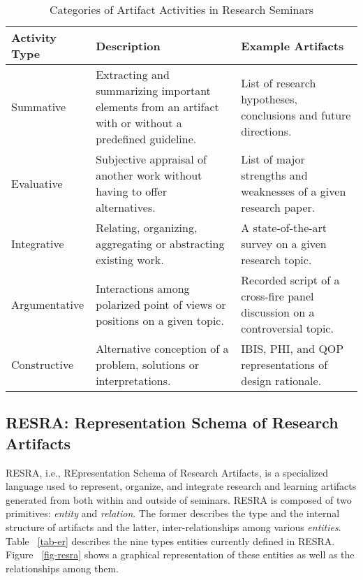 \begin{table}[ht]
  \begin{center}
    \begin{tabular} {|l|p{2.5in}|p{2.5in}|} \hline   
      
      {\bf Activity Type} & {\bf Description} & {\bf Example Artifacts} \\ \hline
      
      Summative & Extracting and summarizing important elements from
      an artifact with or without a predefined guideline. & List of
      research hypotheses, conclusions and future directions. \\
      \hline
      
      Evaluative & Subjective appraisal of another work without
      having to offer alternatives. & List of major strengths and
      weaknesses of a given research paper. \\ \hline
      
      Integrative & Relating, organizing, aggregating or abstracting
      existing work. & A state-of-the-art survey on a given research
      topic. \\ \hline
      
      Argumentative & Interactions among polarized point of views or
      positions on a given topic. & Recorded script of a cross-fire
      panel discussion on a controversial topic. \\ \hline
      
      Constructive & Alternative conception of a problem, solutions or
      interpretations. & IBIS, PHI, and QOP representations of design
      rationale. \\ \hline
    \end{tabular}
    \caption{Categories of Artifact Activities in Research Seminars}
    \label{tab-act}
  \end{center}
\end{table}


\subsection{RESRA: Representation Schema of Research Artifacts}

RESRA, i.e., REpresentation Schema of Research Artifacts, is a specialized
language used to represent, organize, and integrate research and learning
artifacts generated from both within and outside of seminars.  RESRA is
composed of two primitives: {\it entity\/} and {\it relation\/}.  The
former describes the type and the internal structure of artifacts and the
latter, inter-relationships among various {\it entities\/}. Table
~\ref{tab-er} describes the nine types entities currently defined in RESRA.
Figure ~\ref{fig-resra} shows a graphical representation of these entities
as well as the relationships among them.

